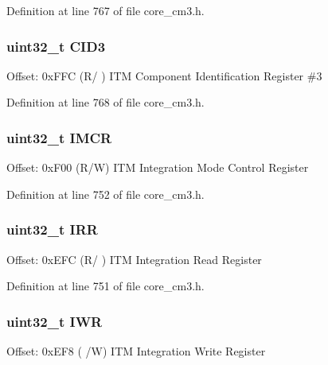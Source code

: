 Definition at line 767 of file core\+\_\+cm3.\+h.

\subsubsection[{\texorpdfstring{C\+I\+D3}{CID3}}]{ uint32\+\_\+t C\+I\+D3}\hypertarget{struct_i_t_m___type_ab9af64f413bf6f67e2a8044481292f67}{}\label{struct_i_t_m___type_ab9af64f413bf6f67e2a8044481292f67}
Offset\+: 0x\+F\+FC (R/ ) I\+TM Component Identification Register \#3 

Definition at line 768 of file core\+\_\+cm3.\+h.

\subsubsection[{\texorpdfstring{I\+M\+CR}{IMCR}}]{ uint32\+\_\+t I\+M\+CR}\hypertarget{struct_i_t_m___type_af0446ee5dcb6082dc8bba9adcc8ec812}{}\label{struct_i_t_m___type_af0446ee5dcb6082dc8bba9adcc8ec812}
Offset\+: 0x\+F00 (R/W) I\+TM Integration Mode Control Register 

Definition at line 752 of file core\+\_\+cm3.\+h.

\subsubsection[{\texorpdfstring{I\+RR}{IRR}}]{ uint32\+\_\+t I\+RR}\hypertarget{struct_i_t_m___type_ae300b6ee4d883ceec8f3572fc0fc3d69}{}\label{struct_i_t_m___type_ae300b6ee4d883ceec8f3572fc0fc3d69}
Offset\+: 0x\+E\+FC (R/ ) I\+TM Integration Read Register 

Definition at line 751 of file core\+\_\+cm3.\+h.

\subsubsection[{\texorpdfstring{I\+WR}{IWR}}]{ uint32\+\_\+t I\+WR}\hypertarget{struct_i_t_m___type_a68e56eb5e16d2aa293b0bec5c99e50fe}{}\label{struct_i_t_m___type_a68e56eb5e16d2aa293b0bec5c99e50fe}
Offset\+: 0x\+E\+F8 ( /W) I\+TM Integration Write Register 

